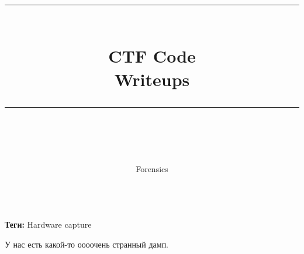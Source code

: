 \documentclass[idxtotoc,hyperref,openany,oneside]{files/forensics} %
\newcommand{\HRule}{\rule{\linewidth}{0.5mm}} %
\begin{document}

\frontmatter %
\title{
\begin{center}
\HRule \\[0.4cm]
{\Huge \bfseries CTF Code \\[0.5cm] \Large Writeups}\\[0.4cm] %
\HRule \\[1.5cm]
\end{center}
}
\author{\Huge Forensics \\ \\[2cm]} %
\maketitle

\tableofcontents

\mainmatter %












\textbf{Теги:} Hardware capture\vspace{\baselineskip}

\begin{tcolorbox}
У нас есть какой-то оооочень странный дамп.
\end{tcolorbox}
\end{document}

